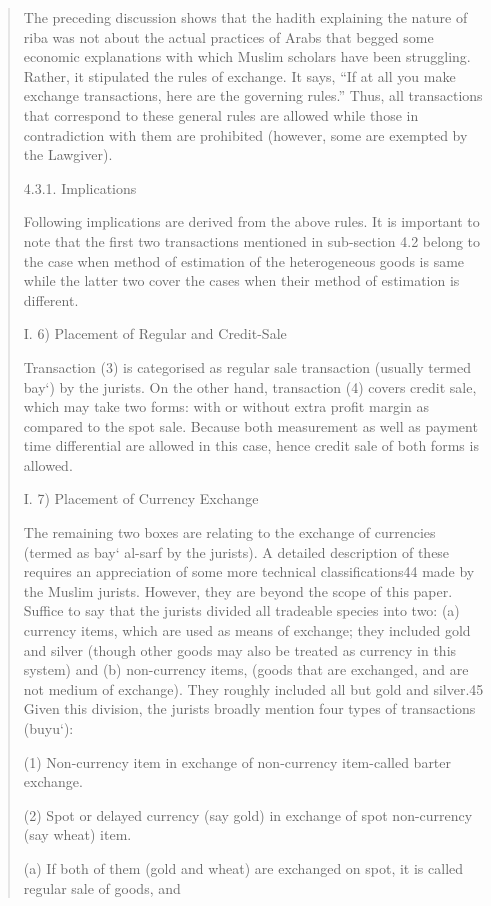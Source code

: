\begin{quote}
The preceding discussion shows that the hadith explaining the nature of riba was not about the actual practices of Arabs that begged some economic explanations with which Muslim scholars have been struggling. Rather, it stipulated the rules of exchange. It says, “If at all you make exchange transactions, here are the governing rules.” Thus, all transactions that correspond to these general rules are allowed while those in contradiction with them are prohibited (however, some are exempted by the Lawgiver).

4.3.1. Implications

Following implications are derived from the above rules. It is important to note that the first two transactions mentioned in sub-section 4.2 belong to the case when method of estimation of the heterogeneous goods is same while the latter two cover the cases when their method of estimation is different.

I. 6) Placement of Regular and Credit-Sale

Transaction (3) is categorised as regular sale transaction (usually termed bay‘) by the jurists. On the other hand, transaction (4) covers credit sale, which may take two forms: with or without extra profit margin as compared to the spot sale. Because both measurement as well as payment time differential are allowed in this case, hence credit sale of both forms is allowed.

I. 7) Placement of Currency Exchange

The remaining two boxes are relating to the exchange of currencies (termed as bay‘ al-sarf by the jurists). A detailed description of these requires an appreciation of some more technical classifications44 made by the Muslim jurists. However, they are beyond the scope of this paper. Suffice to say that the jurists divided all tradeable species into two: (a) currency items, which are used as means of exchange; they included gold and silver (though other goods may also be treated as currency in this system) and (b) non-currency items, (goods that are exchanged, and are not medium of exchange). They roughly included all but gold and silver.45 Given this division, the jurists broadly mention four types of transactions (buyu‘):

(1) Non-currency item in exchange of non-currency item-called barter exchange.

(2) Spot or delayed currency (say gold) in exchange of spot non-currency (say wheat) item.

(a) If both of them (gold and wheat) are exchanged on spot, it is called regular sale of goods, and


\end{quote}
